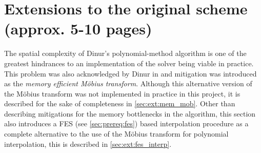 \section{Extensions to the original scheme (approx. 5-10 pages)} \label{sec:ext}
The spatial complexity of Dinur's polynomial-method algorithm is one of the greatest hindrances to an implementation of the solver being viable in practice. This problem was also acknowledged by Dinur in \cite{eurocrypt-2021-30841} and mitigation was introduced as the \textit{memory efficient Möbius transform}. Although this alternative version of the Möbius transform was not implemented in practice in this project, it is described for the sake of completeness in \cref{sec:ext:mem_mob}. Other than describing mitigations for the memory bottlenecks in the algorithm, this section also introduces a FES (see \cref{sec:prereq:fes}) based interpolation procedure as a complete alternative to the use of the Möbius transform for polynomial interpolation, this is described in \cref{sec:ext:fes_interp}.
 


 

